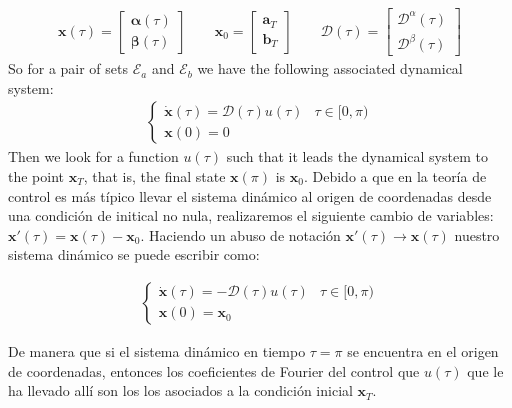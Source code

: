 \begin{gather}
    \bm{x}(\tau) = \begin{bmatrix}
        \bm{\alpha}(\tau) \\  \bm{\beta}(\tau)
    \end{bmatrix} \hspace{2em}
    \bm{x}_0 = \begin{bmatrix}
        \bm{a}_T \\  \bm{b}_T
    \end{bmatrix} \hspace{2em}
    \bm{\mathcal{D}}(\tau) = \begin{bmatrix}
        \bm{\mathcal{D}}^\alpha(\tau) \\  
        \bm{\mathcal{D}}^\beta(\tau)
    \end{bmatrix}     
\end{gather}
So for a pair of sets $ \mathcal {E} _a $ and $ \mathcal {E} _b $ we have the following associated dynamical system:
\begin{gather}
    \begin{cases}
        \dot{\bm{x}}(\tau) = \bm{\mathcal{D}}(\tau) u(\tau)  & \tau \in [0,\pi)\\
        \bm{x}(0) = {0}
    \end{cases}
\end{gather}
Then we look for a function $ u (\tau) $ such that it leads the dynamical system to the point $ \bm {x} _T $, that is, the final state $ \bm {x} (\pi) $ is $ \bm {x}_0 $. Debido a que en la teoría de control es más típico llevar el sistema dinámico al origen de coordenadas desde una condición de initical no nula, realizaremos el siguiente cambio de variables: $\bm{x}'(\tau) = \bm{x}(\tau) - \bm{x}_0$. Haciendo un abuso de notación $\bm{x}'(\tau) \rightarrow \bm{x}(\tau)$  nuestro sistema dinámico se puede escribir como:

\begin{gather}
    \begin{cases}
        \dot{\bm{x}}(\tau) = -\bm{\mathcal{D}}(\tau) u(\tau)  & \tau \in [0,\pi)\\
        \bm{x}(0) = \bm{x}_0
    \end{cases}
\end{gather}

De manera que si el sistema dinámico en tiempo $\tau = \pi$ se encuentra en el origen de coordenadas, entonces los coeficientes de Fourier del control que $u(\tau)$ que le ha llevado allí son los los asociados a la condición inicial $\bm{x}_T$. 

